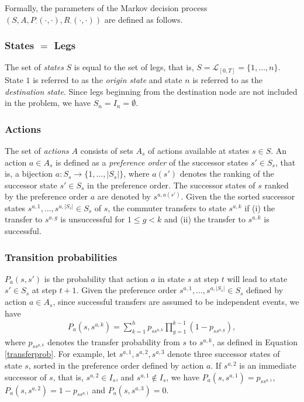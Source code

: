 \documentclass[dissertation,draft*]{aaltoseries}
\begin{document}
Formally, the parameters of the Markov decision process $(S,A,P_{\cdot}(\cdot,\cdot),R_{\cdot}(\cdot,\cdot))$ are defined as follows.

\subsubsection{States $=$ Legs}
\label{statesdef}
The set of \emph{states} $S$ is equal to the set of legs, that is, $S=\mathcal{L}_{[0,T]} = \{1,\ldots,n\}$.
State $1$ is referred to as the \emph{origin state} and state $n$ is referred to as the \emph{destination state}.
Since legs beginning from the destination node are not included in the problem, we have $S_n = I_n = \emptyset$.

\subsubsection{Actions}
\label{actionsdef}
The set of \emph{actions} $A$ consists of sets $A_s$ of actions available at states $s \in S$.
An action $a \in A_s$ is defined as a \emph{preference order} of the successor states $s' \in S_s$, 
that is, a bijection $a:S_s \to \{1,\ldots,|S_s|\}$, where $a(s')$ denotes the ranking of the successor state $s' \in S_s$
in the preference order. The successor states of $s$ ranked by the preference order $a$ are denoted by $s^{a,a(s')}$.
Given the the sorted successor states $s^{a,1}, \ldots, s^{a,|S_s|} \in S_{s}$ of $s$, 
the commuter transfers to state $s^{a,k}$ if 
(i)
the transfer to $s^{a,g}$ is unsuccessful for $1 \leq g < k$ and 
(ii)
the transfer to $s^{a,k}$ is successful.

\subsubsection{Transition probabilities}
\label{transitiondef}
$P_a(s,s')$ is the probability that action $a$ in state $s$ 
at step $t$ will lead to state $s' \in S_s$ at step $t + 1$. 
Given the preference order $s^{a,1}, \ldots, s^{a,|S_s|} \in S_{s}$ defined by action $a \in A_s$, 
since successful transfers are assumed to be independent events, we have 
\begin{align}
\label{ekakaava}
P_a(s,s^{a,k}) 
= \sum_{k=1}^h p_{ss^{a,k}} \prod_{g = 1}^{k-1}(1-p_{ss^{a,g}}),
\end{align}
where $p_{ss^{a,k}}$ denotes the transfer probability from $s$ to $s^{a,k}$, as defined in Equation \eqref{transferprob}.
For example, let $s^{a,1},s^{a,2},s^{a,3}$ denote three successor states of state $s$, sorted in the preference
order defined by action $a$. If $s^{a,2}$ is an immediate successor of $s$, that is, $s^{a,2} \in I_s$, and $s^{a,1} \notin I_s$, 
we have $P_a(s,s^{a,1}) = p_{ss^{a,1}}$, $P_a(s,s^{a,2}) = 1-p_{ss^{a,1}}$
and $P_a(s,s^{a,3}) = 0$.
\end{document}
